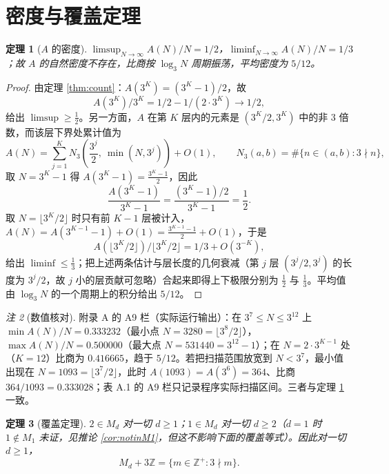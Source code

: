 \documentclass[11pt]{article}
\newtheorem{theorem}{定理}[section]
\theoremstyle{definition}\newtheorem{definition}[theorem]{定义}
\theoremstyle{definition}\newtheorem{conjecture}[theorem]{猜想}
\theoremstyle{remark}\newtheorem{remark}[theorem]{注}
\begin{document}
\section{密度与覆盖定理}
\begin{theorem}[$A$ 的密度]\label{thm:density}
$\displaystyle\limsup_{N\to\infty}A(N)/N=1/2$，$\displaystyle\liminf_{N\to\infty}A(N)/N=1/3$；故 $A$ 的自然密度不存在，比商按 $\log_3N$ 周期振荡，平均密度为 $5/12$。
\end{theorem}
\begin{proof}
由定理 \ref{thm:count}：$A(3^K)=(3^K-1)/2$，故
\[A(3^K)/3^K=1/2-1/(2\cdot3^K)\longrightarrow1/2,\]
给出 $\limsup\ge\frac12$。另一方面，$A$ 在第 $K$ 层内的元素是 $(3^K/2,3^K)$ 中的非 3 倍数，而该层下界处累计值为
\[A(N)=\sum_{j=1}^{K}N_3\!\left(\frac{3^{j}}{2},\ \min(N,3^{j})\right)+O(1),\qquad N_3(a,b)=\#\{n\in(a,b):3\nmid n\},\]
取 $N=3^K-1$ 得 $A(3^K-1)=\frac{3^K-1}{2}$，因此
\[\frac{A(3^K-1)}{3^K-1}=\frac{(3^K-1)/2}{3^K-1}=\frac12.\]
取 $N=\lfloor3^K/2\rfloor$ 时只有前 $K-1$ 层被计入，$A(N)=A(3^{K-1}-1)+O(1)=\frac{3^{K-1}-1}{2}+O(1)$，于是
\[A(\lfloor3^K/2\rfloor)/\lfloor3^K/2\rfloor=1/3+O(3^{-K}),\]
给出 $\liminf\le\frac13$；把上述两条估计与层长度的几何衰减（第 $j$ 层 $(3^j/2,3^j)$ 的长度为 $3^j/2$，故 $j$ 小的层贡献可忽略）合起来即得上下极限分别为 $\frac12$ 与 $\frac13$。平均值由 $\log_3N$ 的一个周期上的积分给出 $5/12$。
\end{proof}
\begin{remark}[数值核对]\label{rem:A9}
附录 A 的 A9 栏（实际运行输出）：在 $3^7\le N\le3^{12}$ 上 $\min A(N)/N=0.333232$（最小点 $N=3280=\lfloor3^8/2\rfloor$），$\max A(N)/N=0.500000$（最大点 $N=531440=3^{12}-1$）；在 $N=2\cdot3^{K-1}$ 处（$K=12$）比商为 $0.416665$，趋于 $5/12$。若把扫描范围放宽到 $N<3^7$，最小值出现在 $N=1093=\lfloor3^7/2\rfloor$，此时 $A(1093)=A(3^6)=364$、比商 $364/1093=0.333028$；表 A.1 的 A9 栏只记录程序实际扫描区间。三者与定理 \ref{thm:density} 一致。
\end{remark}
\begin{theorem}[覆盖定理]\label{thm:cover}
$2\in M_d$ 对一切 $d\ge1$；$1\in M_d$ 对一切 $d\ge2$（$d=1$ 时 $1\notin M_1$ 未证，见推论 \ref{cor:notinM1}，但这不影响下面的覆盖等式）。因此对一切 $d\ge1$，
\[M_d+3\mathbb{Z}=\{m\in\mathbb{Z}^+:3\nmid m\}.\]
\end{theorem}
\end{document}
